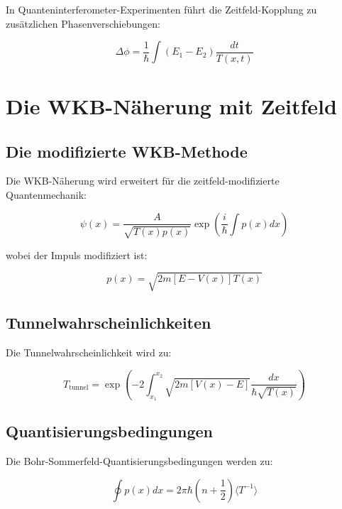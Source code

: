 \documentclass[12pt,a4paper]{report}
\begin{document}
In Quanteninterferometer-Experimenten führt die Zeitfeld-Kopplung zu zusätzlichen Phasenverschiebungen:

\begin{equation}
	\Delta\phi = \frac{1}{\hbar}\int (E_1 - E_2) \frac{dt}{T(x,t)}
\end{equation}

\section{Die WKB-Näherung mit Zeitfeld}

\subsection{Die modifizierte WKB-Methode}

Die WKB-Näherung wird erweitert für die zeitfeld-modifizierte Quantenmechanik:

\begin{equation}
	\psi(x) = \frac{A}{\sqrt{T(x)p(x)}} \exp\left(\frac{i}{\hbar}\int p(x) dx\right)
\end{equation}

wobei der Impuls modifiziert ist:

\begin{equation}
	p(x) = \sqrt{2m[E - V(x)]T(x)}
\end{equation}

\subsection{Tunnelwahrscheinlichkeiten}

Die Tunnelwahrscheinlichkeit wird zu:

\begin{equation}
	T_{\text{tunnel}} = \exp\left(-2\int_{x_1}^{x_2} \sqrt{2m[V(x) - E]} \frac{dx}{\hbar\sqrt{T(x)}}\right)
\end{equation}

\subsection{Quantisierungsbedingungen}

Die Bohr-Sommerfeld-Quantisierungsbedingungen werden zu:

\begin{equation}
	\oint p(x) dx = 2\pi\hbar\left(n + \frac{1}{2}\right)\langle T^{-1}\rangle
\end{equation}
\end{document}

